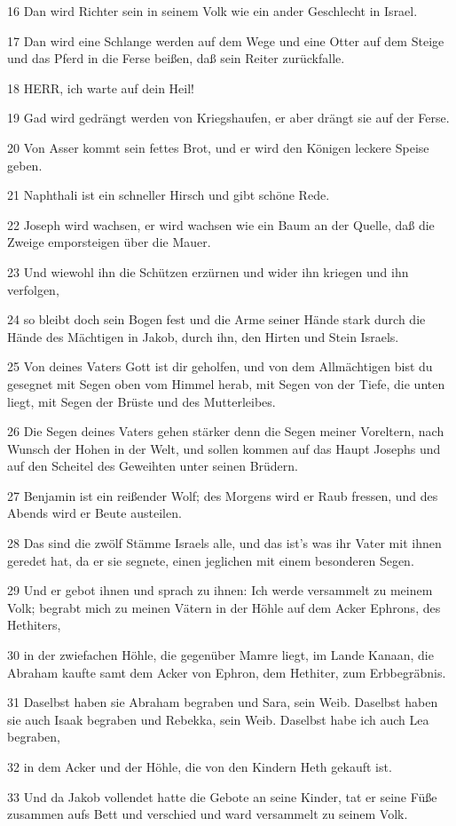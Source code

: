 \par 16 Dan wird Richter sein in seinem Volk wie ein ander Geschlecht in Israel.
\par 17 Dan wird eine Schlange werden auf dem Wege und eine Otter auf dem Steige und das Pferd in die Ferse beißen, daß sein Reiter zurückfalle.
\par 18 HERR, ich warte auf dein Heil!
\par 19 Gad wird gedrängt werden von Kriegshaufen, er aber drängt sie auf der Ferse.
\par 20 Von Asser kommt sein fettes Brot, und er wird den Königen leckere Speise geben.
\par 21 Naphthali ist ein schneller Hirsch und gibt schöne Rede.
\par 22 Joseph wird wachsen, er wird wachsen wie ein Baum an der Quelle, daß die Zweige emporsteigen über die Mauer.
\par 23 Und wiewohl ihn die Schützen erzürnen und wider ihn kriegen und ihn verfolgen,
\par 24 so bleibt doch sein Bogen fest und die Arme seiner Hände stark durch die Hände des Mächtigen in Jakob, durch ihn, den Hirten und Stein Israels.
\par 25 Von deines Vaters Gott ist dir geholfen, und von dem Allmächtigen bist du gesegnet mit Segen oben vom Himmel herab, mit Segen von der Tiefe, die unten liegt, mit Segen der Brüste und des Mutterleibes.
\par 26 Die Segen deines Vaters gehen stärker denn die Segen meiner Voreltern, nach Wunsch der Hohen in der Welt, und sollen kommen auf das Haupt Josephs und auf den Scheitel des Geweihten unter seinen Brüdern.
\par 27 Benjamin ist ein reißender Wolf; des Morgens wird er Raub fressen, und des Abends wird er Beute austeilen.
\par 28 Das sind die zwölf Stämme Israels alle, und das ist's was ihr Vater mit ihnen geredet hat, da er sie segnete, einen jeglichen mit einem besonderen Segen.
\par 29 Und er gebot ihnen und sprach zu ihnen: Ich werde versammelt zu meinem Volk; begrabt mich zu meinen Vätern in der Höhle auf dem Acker Ephrons, des Hethiters,
\par 30 in der zwiefachen Höhle, die gegenüber Mamre liegt, im Lande Kanaan, die Abraham kaufte samt dem Acker von Ephron, dem Hethiter, zum Erbbegräbnis.
\par 31 Daselbst haben sie Abraham begraben und Sara, sein Weib. Daselbst haben sie auch Isaak begraben und Rebekka, sein Weib. Daselbst habe ich auch Lea begraben,
\par 32 in dem Acker und der Höhle, die von den Kindern Heth gekauft ist.
\par 33 Und da Jakob vollendet hatte die Gebote an seine Kinder, tat er seine Füße zusammen aufs Bett und verschied und ward versammelt zu seinem Volk.

